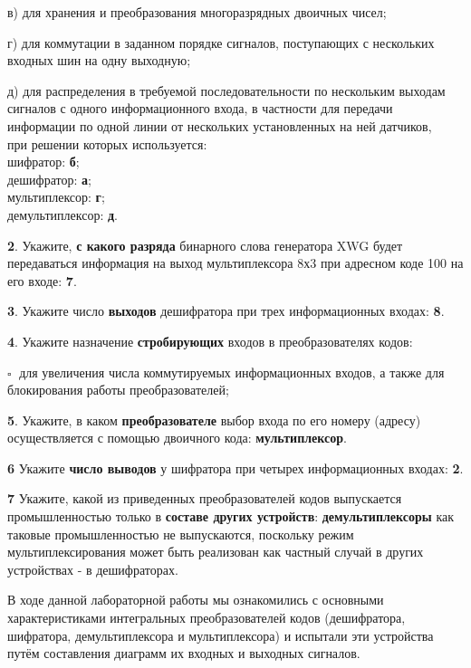 \documentclass[spec, och, otchet, hidelinks]{SCWorks}
\begin{document}
\par в) для хранения и преобразования многоразрядных двоичных чисел;

\par г) для коммутации в заданном порядке сигналов, поступающих с нескольких входных шин на одну выходную;

\par д) для распределения в требуемой последовательности по нескольким выходам сигналов с одного 
информационного входа, в частности для передачи информации по одной линии от нескольких установленных 
на ней датчиков, \\
при решении которых используется: \\
шифратор: \textbf{б}; \\
дешифратор: \textbf{а}; \\
мультиплексор: \textbf{г}; \\
демультиплексор: \textbf{д}. \\

\par \textbf{2}. Укажите, \textbf{с какого разряда} бинарного слова генератора XWG будет передаваться 
информация на выход мультиплексора 8х3 при адресном коде 100 на его входе: \textbf{7}. \\

\par \textbf{3}. Укажите число \textbf{выходов} дешифратора при трех информационных входах: \textbf{8}. \\

\newpage

\par \textbf{4}. Укажите назначение \textbf{стробирующих} входов в преобразователях кодов:
\par $ \square \; $ для увеличения числа коммутируемых информационных входов, а также для блокирования 
работы преобразователей; \\

\par \textbf{5}. Укажите, в каком \textbf{преобразователе} выбор входа по его номеру (адресу) 
осуществляется с помощью двоичного кода: \textbf{мультиплексор}. \\

\par \textbf{6} Укажите \textbf{число выводов} у шифратора при четырех информационных входах: 
\textbf{2}. \\

\par \textbf{7} Укажите, какой из приведенных преобразователей кодов выпускается промышленностью только 
в \textbf{составе других устройств}: \textbf{демультиплексоры} как таковые промышленностью не 
выпускаются, поскольку режим мультиплексирования может быть реализован как частный случай в других 
устройствах - в дешифраторах.

\newpage

\conclusion

\par В ходе данной лабораторной работы мы ознакомились с основными характеристиками интегральных 
преобразователей кодов (дешифратора, шифратора, демультиплексора и мультиплексора) 
и испытали эти устройства путём составления диаграмм их входных и выходных сигналов.
\end{document}
